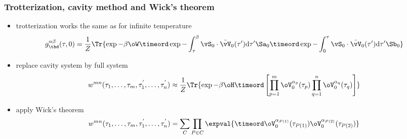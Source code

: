 \begin{frame}
	\frametitle{ Trotterization, cavity method and Wick's theorem }
    \begin{itemize}
        \item trotterization works the same as for infinite temperature
        \begin{align*}
            g^{\alpha\beta}_{\thd}(\tau,0) &= \frac{1}{Z} \Tr{ \exp{-\beta\oW} \timeord \exp{ -\int_\tau^\beta \vS_0 \cdot \tilde{\vV}_0(\tau') \mathrm{d}\tau' } \Sa_0 \timeord \exp{ -\int_0^\tau \vS_0 \cdot \tilde{\vV}_0(\tau') \mathrm{d}\tau' } \Sb_0 }
        \end{align*}
        \item replace cavity system by full system
        \begin{align*}
            w^{mn}(\tau_1,\dots,\tau_m,\tau_1^{'},\dots,\tau_n^{'}) &\approx \frac{1}{Z} \Tr{ \exp{-\beta\oH} \timeord \left[\prod_{p=1}^{m} \oV_0^{\alpha_p} (\tau_p) \prod_{q=1}^{n} \oV_0^{\alpha_q} (\tau_q) \right] }
        \end{align*}
        \item apply Wick's theorem
        \begin{align*}
            w^{mn}(\tau_1,\dots,\tau_m,\tau_1^{'},\dots,\tau_n^{'}) &= \sum_{C} \prod_{P\in C} \expval{ \timeord \oV_0^{\alpha_{P(1)}} (\tau_{P(1)}) \oV_0^{\alpha_{P(2)}} (\tau_{P(2)}) }
        \end{align*}
    \end{itemize}
\end{frame}

